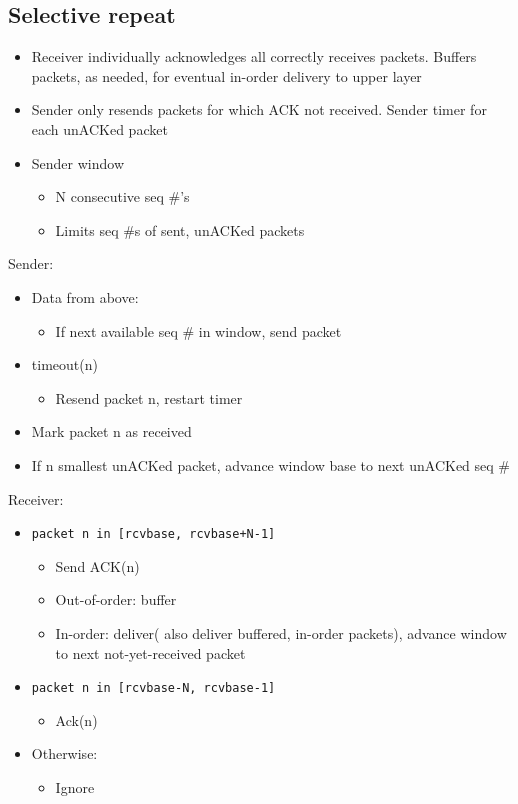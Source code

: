 \documentclass{article}[18pt]
\begin{document}
\subsection{Selective repeat}
\begin{itemize}
	\item Receiver individually acknowledges all correctly receives packets. Buffers packets, as needed, for eventual in-order delivery to upper layer
	\item Sender only resends packets for which ACK not received. Sender timer for each unACKed packet
	\item Sender window
	\begin{itemize}
		\item N consecutive seq \#'s
		\item Limits seq \#s of sent, unACKed packets
	\end{itemize}
\end{itemize}
\begin{minipage}{0.5\textwidth}
Sender:
\begin{itemize}
	\item Data from above:
	\begin{itemize}
		\item If next available seq \# in window, send packet
	\end{itemize}
	\item timeout(n)
	\begin{itemize}
		\item Resend packet n, restart timer
	\end{itemize}
	\item Mark packet n as received
	\item If n smallest unACKed packet, advance window base to next unACKed seq \#
\end{itemize}
\end{minipage}
\begin{minipage}{0.5\textwidth}
Receiver:
\begin{itemize}
	\item \texttt{packet n in [rcvbase, rcvbase+N-1]}
	\begin{itemize}
	\item Send ACK(n)
	\item Out-of-order: buffer
	\item In-order: deliver( also deliver buffered, in-order packets), advance window to next not-yet-received packet
	\end{itemize}
	\item \texttt{packet n in [rcvbase-N, rcvbase-1]}
	\begin{itemize}
		\item Ack(n)
	\end{itemize}
	\item Otherwise:
	\begin{itemize}
		\item Ignore
	\end{itemize} 
\end{itemize}
\end{minipage}
\end{document}

